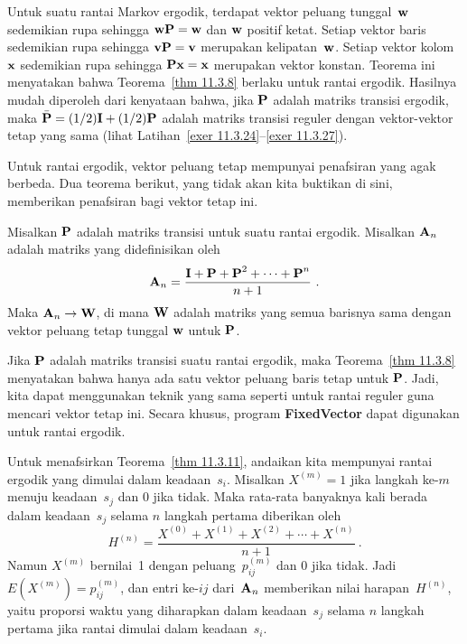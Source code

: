\begin{theorem}\label{thm 11.3.10}
Untuk suatu rantai Markov ergodik, terdapat vektor peluang tunggal~${\mbox{\bf w}\/}$
sedemikian rupa sehingga ${\mbox{\bf w}\/} {\mbox{\bf P}\/} = {\mbox{\bf w}\/}$ dan ${\mbox{\bf w}\/}$ positif
ketat. Setiap vektor baris sedemikian rupa sehingga
${\mbox{\bf v}\/} {\mbox{\bf P}\/} = {\mbox{\bf v}\/}$ merupakan kelipatan~${\mbox{\bf w}\/}$. Setiap vektor
kolom~${\mbox{\bf x}\/}$ sedemikian rupa sehingga ${\mbox{\bf P}\/} {\mbox{\bf x}\/} = {\mbox{\bf x}\/}$
merupakan vektor konstan.
\proof
Teorema ini menyatakan bahwa Teorema~\ref{thm 11.3.8} berlaku untuk rantai
ergodik. Hasilnya mudah diperoleh dari kenyataan bahwa, jika ${\mbox{\bf P}\/}$ adalah
matriks transisi ergodik, maka
$\bar{{\mbox{\bf P}\/}} = (1/2){\mbox{\bf I}\/} + (1/2){\mbox{\bf P}\/}$ adalah matriks transisi reguler
dengan vektor-vektor tetap yang sama (lihat Latihan~\ref{exer
11.3.24}--\ref{exer 11.3.27}).
\end{theorem}
\par
Untuk rantai ergodik, vektor peluang tetap mempunyai penafsiran yang agak
berbeda. Dua teorema berikut, yang tidak akan kita buktikan di sini, memberikan
penafsiran bagi vektor tetap ini.

\begin{theorem}\label{thm 11.3.11}
Misalkan ${\mbox{\bf P}\/}$ adalah matriks transisi untuk suatu rantai ergodik. Misalkan
${\mbox{\bf A}\/}_n$ adalah matriks yang didefinisikan oleh
$$
{\mbox{\bf A}\/}_n = \frac{{\mbox{\bf I}\/} + {\mbox{\bf P}\/} + {\mbox{\bf P}\/}^2 +\cdots + {\mbox{\bf P}\/}^n}{n +
1}\ .
$$
Maka ${\mbox{\bf A}\/}_n \to {\mbox{\bf W}\/}$, di mana ${\mbox{\bf W}\/}$ adalah matriks yang semua
barisnya sama dengan vektor peluang tetap tunggal ${\mbox{\bf w}\/}$ untuk ${\mbox{\bf P}\/}$.  
\end{theorem}

\par
Jika ${\mbox{\bf P}\/}$ adalah matriks transisi suatu rantai ergodik, maka
Teorema~\ref{thm 11.3.8} menyatakan bahwa hanya ada satu vektor peluang baris
tetap untuk ${\mbox{\bf P}\/}$. Jadi, kita dapat menggunakan teknik yang sama seperti
untuk rantai reguler guna mencari vektor tetap ini. Secara khusus, program
{\bf FixedVector} dapat digunakan untuk rantai ergodik.
\par
Untuk menafsirkan Teorema~\ref{thm 11.3.11}, andaikan kita mempunyai rantai
ergodik yang dimulai dalam keadaan~$s_i$. Misalkan $X^{(m)} = 1$ jika langkah
ke-$m$ menuju keadaan~$s_j$ dan 0 jika tidak. Maka rata-rata banyaknya kali
berada dalam keadaan~$s_j$ selama $n$ langkah pertama diberikan oleh
$$
H^{(n)} = \frac{X^{(0)} + X^{(1)} + X^{(2)} +\cdots+ X^{(n)}}{n + 1}\ .
$$
Namun $X^{(m)}$ bernilai~1 dengan peluang~$p_{ij}^{(m)}$ dan 0 jika tidak.
Jadi $E(X^{(m)}) = p_{ij}^{(m)}$, dan entri ke-$ij$ dari~${\mbox{\bf A}\/}_n$
memberikan nilai harapan~$H^{(n)}$, yaitu proporsi waktu yang diharapkan dalam
keadaan~$s_j$ selama $n$ langkah pertama jika rantai dimulai dalam keadaan~$s_i$.

